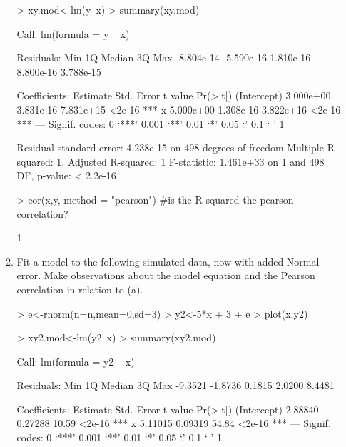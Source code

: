 \documentclass{article}
\begin{document}
\begin{enumerate}
\begin{enumerate}
\begin{Schunk}
\begin{Sinput}
> xy.mod<-lm(y~x) 
> summary(xy.mod) 
\end{Sinput}
\begin{Soutput}
Call:
lm(formula = y ~ x)

Residuals:
       Min         1Q     Median         3Q        Max 
-8.804e-14 -5.590e-16  1.810e-16  8.800e-16  3.788e-15 

Coefficients:
             Estimate Std. Error   t value Pr(>|t|)    
(Intercept) 3.000e+00  3.831e-16 7.831e+15   <2e-16 ***
x           5.000e+00  1.308e-16 3.822e+16   <2e-16 ***
---
Signif. codes:  0 ‘***’ 0.001 ‘**’ 0.01 ‘*’ 0.05 ‘.’ 0.1 ‘ ’ 1

Residual standard error: 4.238e-15 on 498 degrees of freedom
Multiple R-squared:      1,	Adjusted R-squared:      1 
F-statistic: 1.461e+33 on 1 and 498 DF,  p-value: < 2.2e-16
\end{Soutput}
\begin{Sinput}
> cor(x,y, method = "pearson") #is the R squared the pearson correlation?
\end{Sinput}
\begin{Soutput}
[1] 1
\end{Soutput}
\end{Schunk}
  \item Fit a model to the following simulated data, now with added Normal error. Make
  observations about the model equation and the Pearson correlation in relation to (a).
\begin{Schunk}
\begin{Sinput}
> e<-rnorm(n=n,mean=0,sd=3)
> y2<-5*x + 3 + e
> plot(x,y2)
\end{Sinput}
\end{Schunk}

\begin{Schunk}
\begin{Sinput}
> xy2.mod<-lm(y2~x)
> summary(xy2.mod)
\end{Sinput}
\begin{Soutput}
Call:
lm(formula = y2 ~ x)

Residuals:
    Min      1Q  Median      3Q     Max 
-9.3521 -1.8736  0.1815  2.0200  8.4481 

Coefficients:
            Estimate Std. Error t value Pr(>|t|)    
(Intercept)  2.88840    0.27288   10.59   <2e-16 ***
x            5.11015    0.09319   54.84   <2e-16 ***
---
Signif. codes:  0 ‘***’ 0.001 ‘**’ 0.01 ‘*’ 0.05 ‘.’ 0.1 ‘ ’ 1


\end{Soutput}
\end{Schunk}
\end{enumerate}
\end{enumerate}
\end{document}
